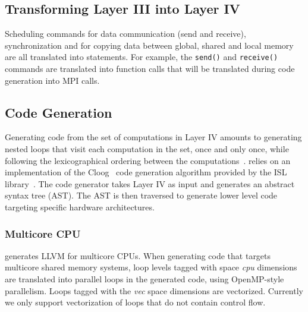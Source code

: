 \subsection{Transforming Layer III into Layer IV}
Scheduling commands for data communication (send and receive), synchronization and for copying data between global, shared and local memory are all translated into statements.  For example, the \texttt{send()} and \texttt{receive()} commands are translated into function calls that will be translated during code generation into MPI calls.

\vspace{-0.25cm}
\subsection{Code Generation}

Generating code from the set of computations in Layer IV amounts to generating nested loops that visit each computation in the set, once and only once, while following the lexicographical ordering between the computations~\cite{Bas04,Iri88,Qui00}. \framework{} relies on an implementation of the Cloog~\cite{Bas04} code generation algorithm provided by the ISL library~\cite{verdoolaege_isl:_2010}. 
The \framework{} code generator takes Layer IV as input and generates an abstract syntax tree (AST).  The AST is then traversed to generate lower level code targeting specific hardware architectures.

\vspace{-0.25cm}
\subsubsection{Multicore CPU}

\framework{} generates LLVM for multicore CPUs.  When generating code that targets multicore shared memory systems, loop levels tagged with space \emph{cpu} dimensions are translated into parallel loops in the generated code, using OpenMP-style parallelism.  Loops tagged with the \emph{vec} space dimensions are vectorized.  Currently we only support vectorization of loops that do not contain control flow.

\vspace{-0.25cm}
